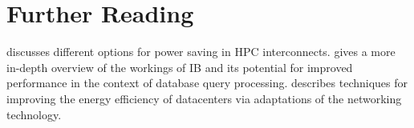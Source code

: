 \documentclass[12pt, a4paper]{article}
\begin{document}
\section{Further Reading}
\cite{hoefler2010software} discusses different options for power saving in HPC interconnects. \cite{Rodiger2015HQ} gives a more in-depth overview of the workings of IB and its potential for improved performance in the context of database query processing. \cite{abts2010energy} describes techniques for improving the energy efficiency of datacenters via adaptations of the networking technology.

\end{document}

